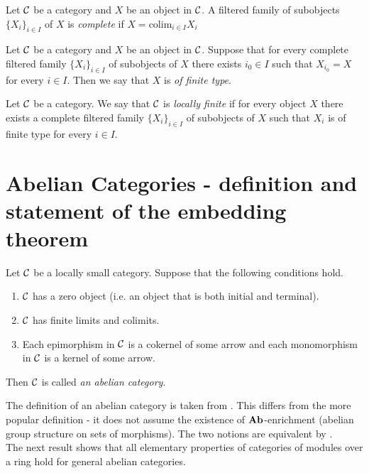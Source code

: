 \begin{definition}
Let ${\mathcal C}$ be a category and $X$ be an object in ${\mathcal C}$. A filtered family of subobjects $\{X_i\}_{i\in I}$ of $X$ is \textit{complete} if $X = \mathrm{colim}_{i\in I}X_i$
\end{definition}

\begin{definition}
Let ${\mathcal C}$ be a category and $X$ be an object in ${\mathcal C}$. Suppose that for every complete filtered family $\{X_i\}_{i\in I}$ of subobjects of $X$ there exists $i_0\in I$ such that $X_{i_0} = X$ for every $i\in I$. Then we say that $X$ is \textit{of finite type}.
\end{definition}

\begin{definition}
Let ${\mathcal C}$ be a category. We say that ${\mathcal C}$ is \textit{locally finite} if for every object $X$ there exists a complete filtered family $\{X_i\}_{i \in I}$ of subobjects of $X$ such that $X_i$ is of finite type for every $i\in I$.
\end{definition}

\section{Abelian Categories - definition and statement of the embedding theorem}

\begin{definition}
Let ${\mathcal C}$ be a locally small category. Suppose that the following conditions hold.
\begin{enumerate}[label=\textbf{(\arabic*)}, leftmargin=3.0em]
\item ${\mathcal C}$ has a zero object (i.e. an object that is both initial and terminal).
\item ${\mathcal C}$ has finite limits and colimits.
\item Each epimorphism in ${\mathcal C}$ is a cokernel of some arrow and each monomorphism in ${\mathcal C}$ is a kernel of some arrow.
\end{enumerate}
Then ${\mathcal C}$ is called \textit{an abelian category}.
\end{definition}
\noindent
The definition of an abelian category is taken from \cite{freyd1964abelian}. This differs from the more popular definition {\cite[page 198]{Maclane}} - it does not assume the existence of $\mathbf{Ab}$-enrichment (abelian group structure on sets of morphisms). The two notions are equivalent by {\cite[Theorem 2.39]{freyd1964abelian}}.\\
The next result shows that all elementary properties of categories of modules over a ring hold for general abelian categories.

